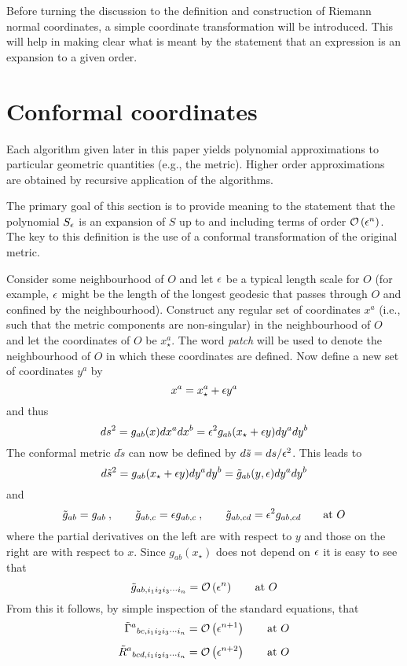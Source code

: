 \documentclass[a4paper,12pt]{article}
\numberwithin{equation}{section}
\begin{document}
Before turning the discussion to the definition and construction of Riemann normal
coordinates, a simple coordinate transformation will be introduced. This will help in making
clear what is meant by the statement that an expression is an expansion to a given order.

\section{Conformal coordinates}\label{sec:Conformal}

Each algorithm given later in this paper yields polynomial approximations to particular
geometric quantities (e.g., the metric). Higher order approximations are obtained by
recursive application of the algorithms.

The primary goal of this section is to provide meaning to the statement that the polynomial
$S_{\epsilon}$ is an expansion of $S$ up to and including terms of order $\mathcal{O}\left(\epsilon^n\right)$. The
key to this definition is the use of a conformal transformation of the original metric.

Consider some neighbourhood of $O$ and let $\epsilon$ be a typical length scale for $O$ (for
example, $\epsilon$ might be the length of the longest geodesic that passes through $O$ and
confined by the neighbourhood). Construct any regular set of coordinates $x^a$ (i.e., such
that the metric components are non-singular) in the neighbourhood of $O$ and let the
coordinates of $O$ be $x^a_{\star}$. The word \emph{patch} will be used to denote the
neighbourhood of $O$ in which these coordinates are defined. Now define a new set of
coordinates $y^a$ by
\[
x^a = x^a_{\star} + \epsilon y^a
\]
and thus
\[
  ds^2 = g_{ab}(x)dx^a dx^b
       = \epsilon^2 g_{ab}(x_{\star} + \epsilon y) dy^a dy^b
\]
The conformal metric $d\tilde s$ can now be defined by $d\tilde s = ds/\epsilon^2$. This leads to
\[
d{\tilde s}^2 = g_{ab}(x_{\star} + \epsilon y) dy^a dy^b
              = {\tilde g}_{ab}(y,\epsilon) dy^a dy^b
\]
and
\[
{\tilde g}_{ab} = g_{ab}\>,\qquad
{\tilde g}_{ab,c} = \epsilon g_{ab,c}\>,\qquad
{\tilde g}_{ab,cd} = \epsilon^2 g_{ab,cd}\qquad \text{at }O
\]
where the partial derivatives on the left are with respect to $y$ and those on
the right are with respect to $x$. Since $g_{ab}(x_{\star})$ does not depend on $\epsilon$
it is easy to see that
\begin{equation*}
{\tilde g}_{ab,i_1i_2i_3\cdots i_n} = \mathcal{O}\left(\epsilon^n\right)\qquad \text{at }O
\end{equation*}
From this it follows, by simple inspection of the standard equations, that
\begin{align*}
{\tilde\Gamma}^{a}{}_{bc,i_1i_2i_3\cdots i_n} &= \mathcal{O}\left(\epsilon^{n+1}\right)\qquad \text{at }O\\[5pt]
{\tilde R}^{a}{}_{bcd,i_1i_2i_3\cdots i_n} &= \mathcal{O}\left(\epsilon^{n+2}\right)\qquad \text{at }O
\end{align*}
\end{document}
